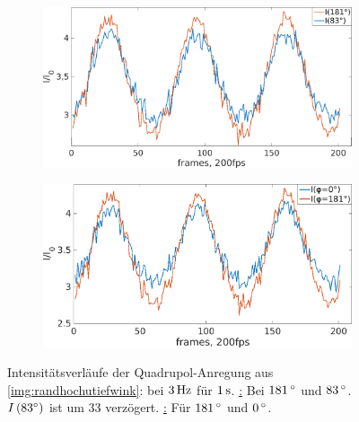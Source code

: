           \begin{figure}[!t]
            \centering
            \begin{subfigure}{0.49\textwidth}
              \centering
              \includegraphics[width=\textwidth,height=0.65\textwidth]{figs/auswertung/plasmaglw/intens83u180quadinphase3Hz1sek.png}
            \end{subfigure}
            \begin{subfigure}{0.49\textwidth}
              \centering
              \includegraphics[width=\textwidth,height=0.65\textwidth]{figs/auswertung/plasmaglw/intens0u180quad3Hz1sek.png}
            \end{subfigure}
            \caption{Intensitätsverläufe der Quadrupol-Anregung aus \autoref{img:randhochutiefwink}:\underline{} bei $\unit[3]{Hz}$ für $\unit[1]{s}$. \underline{:} Bei $\unit[181]{\degree}$ und $\unit[83]{\degree}$. $I\left(83^\circ\right)$ ist um 33  verzögert. \underline{:} Für $\unit[181]{\degree}$  und $\unit[0]{\degree}$. }
            \label{img:intensquadhochwink}
          \end{figure}


